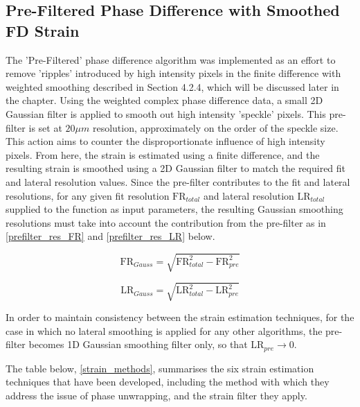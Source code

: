 \subsection{Pre-Filtered Phase Difference with Smoothed FD Strain}
The 'Pre-Filtered' phase difference algorithm was implemented as an effort to remove 'ripples' introduced by high intensity pixels in the finite difference with weighted smoothing described in Section 4.2.4, which will be discussed later in the chapter. Using the weighted complex phase difference data, a small 2D Gaussian filter is applied to smooth out high intensity 'speckle' pixels. This pre-filter is set at $20 \mu m$ resolution, approximately on the order of the speckle size. This action aims to counter the disproportionate influence of high intensity pixels. From here, the strain is estimated using a finite difference, and the resulting strain is smoothed using a 2D Gaussian filter to match the required fit and lateral resolution values. Since the pre-filter contributes to the fit and lateral resolutions, for any given fit resolution $\text{FR}_{total}$ and lateral resolution $\text{LR}_{total}$ supplied to the function as input parameters, the resulting Gaussian smoothing resolutions must take into account the contribution from the pre-filter as in \autoref{prefilter_res_FR} and \autoref{prefilter_res_LR} below.

\begin{equation}
	\text{FR}_{Gauss} = \sqrt{\text{FR}_{total}^2 - \text{FR}_{pre}^2}
    \label{prefilter_res_FR}
\end{equation}

\begin{equation}
    \text{LR}_{Gauss} = \sqrt{\text{LR}_{total}^2 - \text{LR}_{pre}^2}
    \label{prefilter_res_LR}
\end{equation}

In order to maintain consistency between the strain estimation techniques, for the case in which no lateral smoothing is applied for any other algorithms, the pre-filter becomes 1D Gaussian smoothing filter only, so that $\text{LR}_{pre}\rightarrow 0$. 

The table below, \autoref{strain_methods}, summarises the six strain estimation techniques that have been developed, including the method with which they address the issue of phase unwrapping, and the strain filter they apply.

